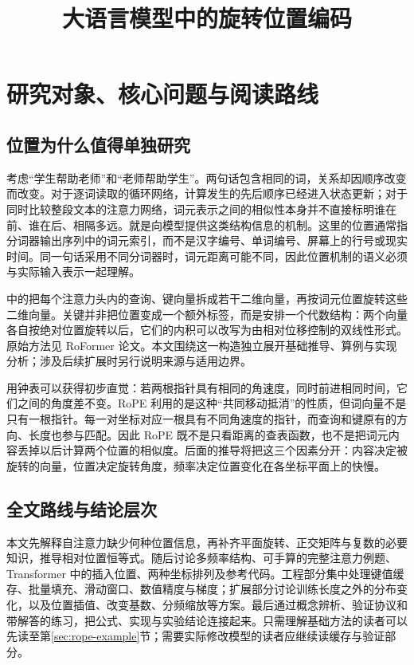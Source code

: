 \documentclass[UTF8,12pt,a4paper,fontset=fandol]{ctexart}
\title{大语言模型中的旋转位置编码}
\author{}
\date{}
\begin{document}
\maketitle
\tableofcontents

\section{研究对象、核心问题与阅读路线}
\label{sec:rope-intro}

\subsection{位置为什么值得单独研究}
考虑“学生帮助老师”和“老师帮助学生”。两句话包含相同的词，关系却因顺序改变而改变。对于逐词读取的循环网络，计算发生的先后顺序已经进入状态更新；对于同时比较整段文本的注意力网络，词元表示之间的相似性本身并不直接标明谁在前、谁在后、相隔多远。就是向模型提供这类结构信息的机制。这里的位置通常指分词器输出序列中的词元索引，而不是汉字编号、单词编号、屏幕上的行号或现实时间。同一句话采用不同分词器时，词元距离可能不同，因此位置机制的语义必须与实际输入表示一起理解。

中的把每个注意力头内的查询、键向量拆成若干二维向量，再按词元位置旋转这些二维向量。关键并非把位置变成一个额外标签，而是安排一个代数结构：两个向量各自按绝对位置旋转以后，它们的内积可以改写为由相对位移控制的双线性形式。原始方法见 RoFormer 论文\cite{su2021}。本文围绕这一构造独立展开基础推导、算例与实现分析；涉及后续扩展时另行说明来源与适用边界。

用钟表可以获得初步直觉：若两根指针具有相同的角速度，同时前进相同时间，它们之间的角度差不变。RoPE 利用的是这种“共同移动抵消”的性质，但词向量不是只有一根指针。每一对坐标对应一根具有不同角速度的指针，而查询和键原有的方向、长度也参与匹配。因此 RoPE 既不是只看距离的查表函数，也不是把词元内容丢掉以后计算两个位置的相似度。后面的推导将把这三个因素分开：内容决定被旋转的向量，位置决定旋转角度，频率决定位置变化在各坐标平面上的快慢。

\subsection{全文路线与结论层次}
本文先解释自注意力缺少何种位置信息，再补齐平面旋转、正交矩阵与复数的必要知识，推导相对位置恒等式。随后讨论多频率结构、可手算的完整注意力例题、Transformer 中的插入位置、两种坐标排列及参考代码。工程部分集中处理键值缓存、批量填充、滑动窗口、数值精度与梯度；扩展部分讨论训练长度之外的分布变化，以及位置插值、改变基数、分频缩放等方案。最后通过概念辨析、验证协议和带解答的练习，把公式、实现与实验结论连接起来。只需理解基础方法的读者可以先读至第\ref{sec:rope-example}节；需要实际修改模型的读者应继续读缓存与验证部分。
\end{document}
